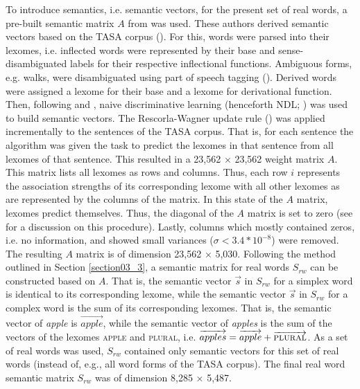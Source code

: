 To introduce semantics, i.e. semantic vectors, for the present set of real words, a pre-built semantic matrix $A$ from \citet{Baayen2019} was used. These authors derived semantic vectors based on the TASA corpus (\cite{Ivens1991}). For this, words were parsed into their lexomes, i.e. inflected words were represented by their base and sense-disambiguated labels for their respective inflectional functions. Ambiguous forms, e.g. walks, were disambiguated using part of speech tagging (\cite{Schmid1999}). Derived words were assigned a lexome for their base and a lexome for derivational function. Then, following \citet{Baayen2016} and \citet{Milin2017Feldman}, naive discriminative learning (henceforth NDL; \cite{Baayen2011, Sering2018}) was used to build semantic vectors. The Rescorla-Wagner update rule (\cite{Rescorla1972, Wagner1972, Rescorla1988}) was applied incrementally to the sentences of the TASA corpus. That is, for each sentence the algorithm was given the task to predict the lexomes in that sentence from all lexomes of that sentence. This resulted in a 23,562 × 23,562 weight matrix $A$. This matrix lists all lexomes as rows and columns. Thus, each row $i$ represents the association strengths of its corresponding lexome with all other lexomes as are represented by the columns of the matrix. In this state of the $A$ matrix, lexomes predict themselves. Thus, the diagonal of the $A$ matrix is set to zero (see \cite{Baayen2019} for a discussion on this procedure). Lastly, columns which mostly contained zeros, i.e. no information, and showed small variances ($σ<3.4*10^{-8}$) were removed. The resulting $A$ matrix is of dimension 23,562 × 5,030. Following the method outlined in Section \ref{section03_3}, a semantic matrix for real words $S_{rw}$ can be constructed based on $A$. That is, the semantic vector $\overrightarrow{s}$ in $S_{rw}$ for a simplex word is identical to its corresponding lexome, while the semantic vector $\overrightarrow{s}$ in $S_{rw}$ for a complex word is the sum of its corresponding lexomes. That is, the semantic vector of \textit{apple} is $\overrightarrow{apple}$, while the semantic vector of \textit{apples} is the sum of the vectors of the lexomes \textsc{apple} and \textsc{plural}, i.e. $\overrightarrow{apples}=\overrightarrow{apple}+\overrightarrow{\textsc{plural}}$. As a set of real words was used, $S_{rw}$ contained only semantic vectors for this set of real words (instead of, e.g., all word forms of the TASA corpus). The final real word semantic matrix $S_{rw}$ was of dimension 8,285 × 5,487.

